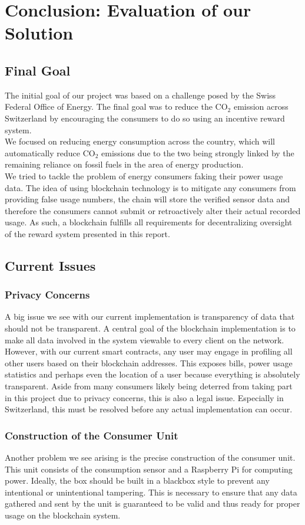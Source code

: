 \documentclass[11pt]{article}
\begin{document}
\pagebreak
\section{Conclusion: Evaluation of our Solution}

\subsection{Final Goal}
The initial goal of our project was based on a challenge posed by the Swiss Federal Office of Energy. The final goal was to reduce the CO$_2$ emission across Switzerland by encouraging the consumers to do so using an incentive reward system.\\
We focused on reducing energy consumption across the country, which will automatically reduce CO$_2$ emissions due to the two being strongly linked by the remaining reliance on fossil fuels in the area of energy production.\\
We tried to tackle the problem of energy consumers faking their power usage data. The idea of using blockchain technology is to mitigate any consumers from providing false usage numbers, the chain will store the verified sensor data and therefore the consumers cannot submit or retroactively alter their actual recorded usage. As such, a blockchain fulfills all requirements for decentralizing oversight of the reward system presented in this report.
\subsection{Current Issues}
\subsubsection{Privacy Concerns} \label{subsec:privacy}
A big issue we see with our current implementation is transparency of data that should not be transparent. A central goal of the blockchain implementation is to make all data involved in the system viewable to every client on the network. However, with our current smart contracts, any user may engage in profiling all other users based on their blockchain addresses. This exposes bills, power usage statistics and perhaps even the location of a user because everything is absolutely transparent. Aside from many consumers likely being deterred from taking part in this project due to privacy concerns, this is also a legal issue. Especially in Switzerland, this must be resolved before any actual implementation can occur.
\subsubsection{Construction of the Consumer Unit}
Another problem we see arising is the precise construction of the consumer unit. This unit consists of the consumption sensor and a Raspberry Pi for computing power. Ideally, the box should be built in a blackbox style to prevent any intentional or unintentional tampering. This is necessary to ensure that any data gathered and sent by the unit is guaranteed to be valid and thus ready for proper usage on the blockchain system.
\end{document}
